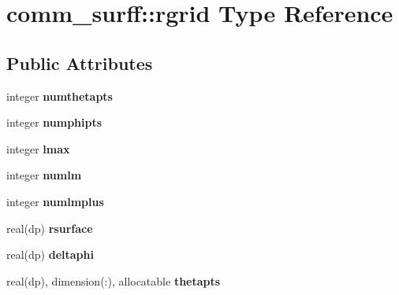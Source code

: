 \hypertarget{structcomm__surff_1_1rgrid}{}\section{comm\+\_\+surff\+:\+:rgrid Type Reference}
\label{structcomm__surff_1_1rgrid}
\subsection*{Public Attributes}
\begin{DoxyCompactItemize}
\item 
\mbox{\label{structcomm__surff_1_1rgrid_a8bfa62e6bdcc1c4d94263a0e5b68faf7}} 
integer {\bfseries numthetapts}
\item 
\mbox{\label{structcomm__surff_1_1rgrid_a914a7bfbb2847409121942c65baf91e4}} 
integer {\bfseries numphipts}
\item 
\mbox{\label{structcomm__surff_1_1rgrid_a2ce0f8806d0fa0efa542a9dcad01115a}} 
integer {\bfseries lmax}
\item 
\mbox{\label{structcomm__surff_1_1rgrid_a4dabe33f3f198f7426b50e1c7d4ce432}} 
integer {\bfseries numlm}
\item 
\mbox{\label{structcomm__surff_1_1rgrid_a85dfe8ae0ff362b3cbce318c5b0f0dcf}} 
integer {\bfseries numlmplus}
\item 
\mbox{\label{structcomm__surff_1_1rgrid_a9f5037b3a2e557385678384677ae1b2b}} 
real(dp) {\bfseries rsurface}
\item 
\mbox{\label{structcomm__surff_1_1rgrid_af563dcb9e2e4e68622a04cdf034328d4}} 
real(dp) {\bfseries deltaphi}
\item 
\mbox{\label{structcomm__surff_1_1rgrid_ab61dcbc831cd8d8b4a726eafdeb4d629}} 
real(dp), dimension(\+:), allocatable {\bfseries thetapts}
\item 
\mbox{\label{structcomm__surff_1_1rgrid_a88f08563d2373265a46e2b8e98f47743}} 

\end{DoxyCompactItemize}
